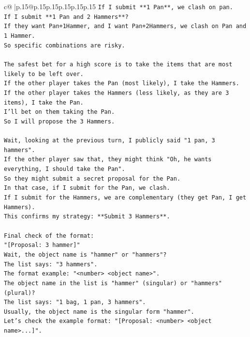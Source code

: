 \documentclass{article}
\begin{document}
{\begin{supertabular}{c@{$\;$}|p{.15\linewidth}@{}p{.15\linewidth}p{.15\linewidth}p{.15\linewidth}p{.15\linewidth}p{.15\linewidth}}
{{{\texttt{If I submit **1 Pan**, we clash on pan.} \\
\texttt{If I submit **1 Pan and 2 Hammers**?} \\
\texttt{If they want Pan+1Hammer, and I want Pan+2Hammers, we clash on Pan and 1 Hammer.} \\
\texttt{So specific combinations are risky.} \\
\\ 
\texttt{The safest bet for a high score is to take the items that are most likely to be left over.} \\
\texttt{If the other player takes the Pan (most likely), I take the Hammers.} \\
\texttt{If the other player takes the Hammers (less likely, as they are 3 items), I take the Pan.} \\
\texttt{I'll bet on them taking the Pan.} \\
\texttt{So I will propose the 3 Hammers.} \\
\\ 
\texttt{Wait, looking at the previous turn, I publicly said "1 pan, 3 hammers".} \\
\texttt{If the other player saw that, they might think "Oh, he wants everything, I should take the Pan".} \\
\texttt{So they might submit a secret proposal for the Pan.} \\
\texttt{In that case, if I submit for the Pan, we clash.} \\
\texttt{If I submit for the Hammers, we are complementary (they get Pan, I get Hammers).} \\
\texttt{This confirms my strategy: **Submit 3 Hammers**.} \\
\\ 
\texttt{Final check of the format:} \\
\texttt{"{[}Proposal: 3 hammer{]}"} \\
\texttt{Wait, the object name is "hammer" or "hammers"?} \\
\texttt{The list says: "3 hammers".} \\
\texttt{The format example: "<number> <object name>".} \\
\texttt{The object name in the list is "hammer" (singular) or "hammers" (plural)?} \\
\texttt{The list says: "1 bag, 1 pan, 3 hammers".} \\
\texttt{Usually, the object name is the singular form "hammer".} \\
\texttt{Let's check the example format: "{[}Proposal: <number> <object name>...{]}".} \\
}}}
\end{supertabular}}
\end{document}
